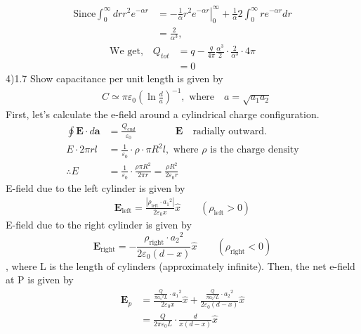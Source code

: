 \documentclass[letterpage]{article}
\begin{document}
\begin{align*}
  \text{Since} \int_0^\infty dr r^2 e^{-\alpha r} &= \left. -\frac{1}{\alpha} r^2 
   e^{-\alpha r} \right| _0^ \infty + \frac{1}{\alpha}2 \int_0^\infty r 
   e^{-\alpha r} dr\\
   &= \frac{2}{\alpha ^3},
\end{align*}
\begin{align*}
  \text{We get,} \quad Q_{tot} &= q-\frac{q}{4 \pi} \frac{\alpha ^3}{2} \cdot \frac{2}{\alpha ^3}
  \cdot 4\pi \\
  &= 0  
\end{align*}
4)1.7 Show capacitance per unit length is given by
\begin{align*}
  &C \simeq \pi \varepsilon_0 \left(\ln \frac{d}{a}\right)^{-1}, 
  \text{ where}\quad a = \sqrt{a_1 a_2}
\end{align*}
First, let's calculate the e-field around a cylindrical charge configuration.
\begin{align*}
  \oint \textbf{E} \cdot d\textbf{a} &= \frac{Q_{end}}{\varepsilon_0} \qquad 
  \qquad  \textbf{E} \quad \text{radially outward.}  \\
  E \cdot 2 \pi rl &= \frac{1}{\varepsilon_0} \cdot \rho \cdot \pi R^2 l, 
  \text{ where } \rho \text{ is the charge density}\\
  \therefore E &= \frac{1}{\varepsilon_0} \cdot \frac{\rho \pi R^2}{2 \pi r}
  = \frac{\rho R^2}{2 \varepsilon_0 r}
\end{align*}
E-field due to the left cylinder is given by
\begin{align*}
  \textbf{E}_{\text{left}} = \frac{\left|\rho_\text{left} \cdot {a_1}^2\right|}
  {2 \varepsilon_0 x} \hat{x}  \qquad \left(\rho_\text{left} >0\right)
\end{align*}
E-field due to the right cylinder is given by
\begin{equation*}
  \textbf{E}_{\text{right}} = -\frac{\rho_\text{right} \cdot {a_2}^2}
  {2 \varepsilon_0 (d-x)} \hat{x} \qquad \left(\rho_{\text{right}} < 0\right)
\end{equation*}
, where L is the length of cylinders (approximately infinite).
Then, the net e-field at P is given by
\begin{align*}
  \textbf{E}_p &= \frac{\frac{Q}{\pi {a_1}^2 L} \cdot {a_1}^2}{2 \varepsilon_0 x}
  \hat{x} + \frac{\frac{Q}{\pi {a_2}^2 L} \cdot {a_2}^2}{2 \varepsilon_0 (d-x)}
  \hat{x}\\
  &= \frac{Q}{2 \pi \varepsilon_0 L} \cdot \frac{d}{x(d-x)} \hat{x} 
\end{align*}
\end{document}
